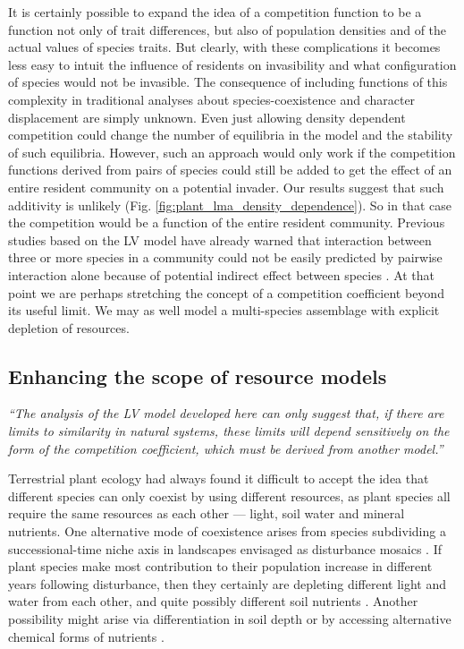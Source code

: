 \documentclass[a4paper,11pt]{article}
\begin{document}
It is certainly possible to expand the idea of a competition function to be a function not only of trait differences, but also of population densities and of the actual values of species traits. But clearly, with these complications it becomes less easy to intuit the influence of residents on invasibility and what configuration of species would not be invasible. The consequence of including functions of this complexity in traditional analyses about species-coexistence and character displacement are simply unknown.
Even just allowing density dependent competition could change the number of equilibria in the model and the stability of such equilibria. However, such an approach would only work if the competition functions derived from pairs of species could still be added to get the effect of an entire resident community on a potential invader. Our results suggest that such additivity is unlikely
(Fig. \ref{fig:plant_lma_density_dependence}). %
 So in that case the competition would be a function of the entire resident community. Previous studies based on the LV model have already warned that interaction between three or more species in a community could not be easily predicted by pairwise interaction alone because of potential indirect effect between species \citep{Levine-1976}.
 At that point we are perhaps stretching the concept of a competition coefficient beyond its useful limit. We may as well model a multi-species assemblage with explicit depletion of resources.

\subsection{Enhancing the scope of resource models}

\emph{``The analysis of the LV model developed here can only suggest that, if there are limits to similarity in natural systems, these limits will depend sensitively on the form of the competition coefficient,
which must be derived from another model.''}\citep{Abrams-1975}

Terrestrial plant ecology had always found it difficult to accept the idea that different species can only coexist by using different resources, as plant species all require the same resources as each other ---
light, soil water and mineral nutrients. One alternative mode of coexistence arises from species subdividing a successional-time niche axis in landscapes envisaged as disturbance mosaics \citep{Connell-1978}. If plant species make most contribution to their population increase in different years following disturbance, then they certainly are depleting different light and water from each other, and quite possibly different soil nutrients \citep{Moorcroft-2001}. Another possibility might arise via differentiation in soil depth or by accessing alternative chemical forms of nutrients \citep{Tilman-1977}.
\end{document}
